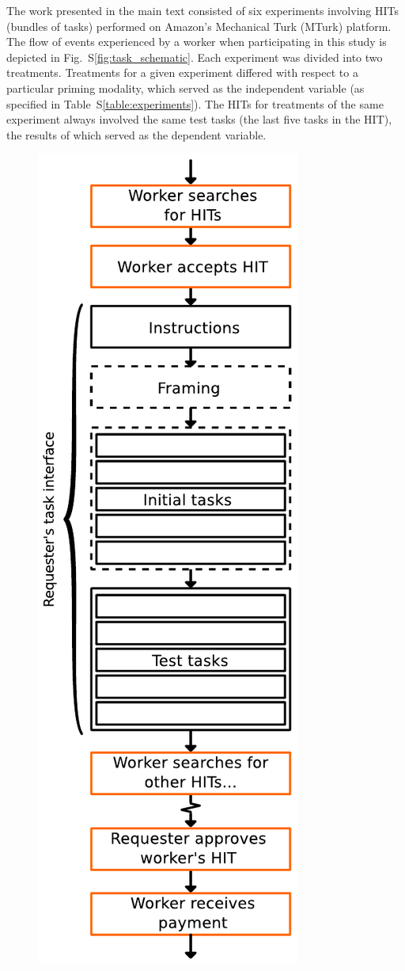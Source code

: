\documentclass[12pt]{article}
\begin{document}
The work presented in the main text consisted of six experiments involving
HITs (bundles of tasks) performed on Amazon's Mechanical Turk (MTurk)
platform.  
The flow of events experienced by a worker when participating in this study 
is depicted in Fig.~S\ref{fig:task_schematic}.  
Each experiment was divided into two treatments.  Treatments for a given 
experiment differed with respect to a particular priming modality, which 
served as the independent variable
(as specified in Table~S\ref{table:experiments}).  
The HITs for treatments of the same experiment always involved the same
test tasks (the last five tasks in the HIT),
the results of which served as the dependent variable.
\begin{figure}
	\begin{center}
	\includegraphics[scale=0.8]{figs/task_schematic.pdf}

\end{center}
\end{figure}
\end{document}
